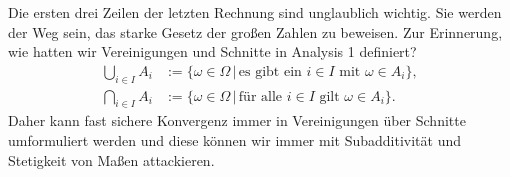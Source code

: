 	Die ersten drei Zeilen der letzten Rechnung sind unglaublich wichtig. Sie werden der Weg sein, das starke Gesetz der gro\ss en Zahlen zu beweisen. Zur Erinnerung, wie hatten wir Vereinigungen und Schnitte in Analysis 1 definiert?
	\begin{align*}
		\bigcup_{i\in I} A_i&:=\{\omega \in \Omega\, |\, \text{es gibt ein }i\in I \text{ mit }\omega \in A_i\},\\
		\bigcap_{i\in I} A_i&:=\{\omega \in \Omega\, |\, \text{f\"ur alle }i\in I \text{ gilt }\omega \in A_i\}.
	\end{align*}
	Daher kann fast sichere Konvergenz immer in Vereinigungen \"uber Schnitte umformuliert werden und diese k\"onnen wir immer mit Subadditivit\"at und Stetigkeit von Ma\ss en attackieren.
\marginpar{\textcolor{red}{Vorlesung 25}}



